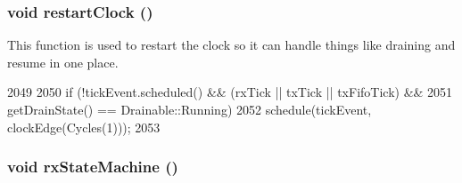 \hypertarget{classIGbE_a9506deecc41eb6290f9b9b8662cc33c2}{
\subsubsection[{restartClock}]{\setlength{\rightskip}{0pt plus 5cm}void restartClock ()}}
\label{classIGbE_a9506deecc41eb6290f9b9b8662cc33c2}
This function is used to restart the clock so it can handle things like draining and resume in one place. 


\begin{DoxyCode}
2049 {
2050     if (!tickEvent.scheduled() && (rxTick || txTick || txFifoTick) &&
2051         getDrainState() == Drainable::Running)
2052         schedule(tickEvent, clockEdge(Cycles(1)));
2053 }
\end{DoxyCode}
\hypertarget{classIGbE_aa22f1272cbc1c6b44dd50faaa71a0d87}{
\subsubsection[{rxStateMachine}]{\setlength{\rightskip}{0pt plus 5cm}void rxStateMachine ()}}
\label{classIGbE_aa22f1272cbc1c6b44dd50faaa71a0d87}



